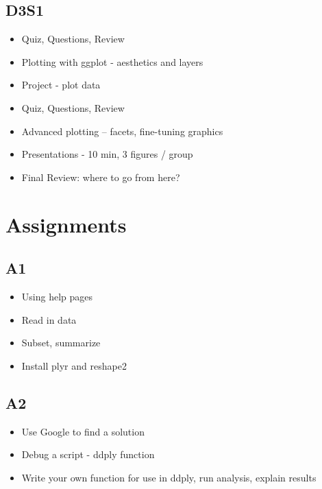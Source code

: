 \documentclass[english, letterpaper, 12pt]{article}
\begin{document}
\subsection*{D3S1}
\begin{itemize}
    \item Quiz, Questions, Review
    \item Plotting with ggplot - aesthetics and layers
    \item Project - plot data
\end{itemize}
\begin{itemize}
    \item Quiz, Questions, Review
    \item Advanced plotting -- facets, fine-tuning graphics
    \item Presentations - 10 min, 3 figures / group
    \item Final Review: where to go from here?
\end{itemize}

\section*{Assignments}
\subsection*{A1}
\begin{itemize}
    \item Using help pages
    \item Read in data
    \item Subset, summarize
    \item Install plyr and reshape2
\end{itemize}

\subsection*{A2}
\begin{itemize}
    \item Use Google to find a solution
    \item Debug a script - ddply function
    \item Write your own function for use in ddply, run analysis, explain
results
\end{itemize}
\end{document}
